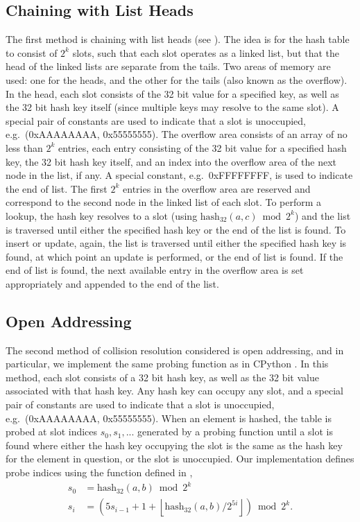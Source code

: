 \documentclass{ucalgthes1}
\theoremstyle{definition}
\newcommand{\floor}[1]{\left\lfloor #1 \right\rfloor}
\newcommand{\hash}{\textrm{hash}_{\textrm{32}}}
\begin{document}
\subsection{Chaining with List Heads}
The first method is chaining with list heads (see \cite[Subsection~11.2]{Cormen2001}).  The idea is for the hash table to consist of $2^k$ slots, such that each slot operates as a linked list, but that the head of the linked lists are separate from the tails.  Two areas of memory are used: one for the heads, and the other for the tails (also known as the overflow).  In the head, each slot consists of the 32 bit value for a specified key, as well as the 32 bit hash key itself (since multiple keys may resolve to the same slot).  A special pair of constants are used to indicate that a slot is unoccupied, e.g.\ (0xAAAAAAAA, 0x55555555).  The overflow area consists of an array of no less than $2^k$ entries, each entry consisting of the 32 bit value for a specified hash key, the 32 bit hash key itself, and an index into the overflow area of the next node in the list, if any.  A special constant, e.g.\ 0xFFFFFFFF, is used to indicate the end of list.  The first $2^k$ entries in the overflow area are reserved and correspond to the second node in the linked list of each slot.  To perform a lookup, the hash key resolves to a slot (using $\hash(a, c) \bmod 2^k$) and the list is traversed until either the specified hash key or the end of the list is found.  To insert or update, again, the list is traversed until either the specified hash key is found, at which point an update is performed, or the end of list is found.  If the end of list is found, the next available entry in the overflow area is set appropriately and appended to the end of the list. 

\subsection{Open Addressing}
\label{subsec:openAddressing}

The second method of collision resolution considered is open addressing, and in particular, we implement the same probing function as in CPython \cite{Kuchling2008}.  In this method, each slot consists of a 32 bit hash key, as well as the 32 bit value associated with that hash key.  Any hash key can occupy any slot, and a special pair of constants are used to indicate that a slot is unoccupied, e.g.\ (0xAAAAAAAA, 0x55555555).   When an element is hashed, the table is probed at slot indices $s_0, s_1, ...$ generated by a probing function until a slot is found where either the hash key occupying the slot is the same as the hash key for the element in question, or the slot is unoccupied.  Our implementation defines probe indices using the function defined in \cite[p.299]{Kuchling2008},
\begin{align*}
	s_0 &= \hash(a,b) \bmod 2^k \\
	s_i &= \left( 5s_{i-1} + 1 + \floor{\hash(a,b)/2^{5i}} \right) \bmod 2^k.
\end{align*}
\end{document}
